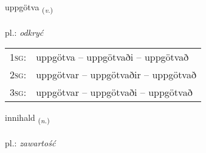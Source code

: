 \documentclass[frontgrid, backgrid]{flacards}\usepackage[]{graphicx}\usepackage[]{xcolor}
\begin{document}
\renewcommand{\flhead}{\vskip5pt \fboxsep=0pt {\small\bfseries\footnotesize Sagnorð | czasownik}}
\renewcommand{\fcfoot}{\vskip5pt \fboxsep=0pt \hspace{2pt}{\small\bfseries\footnotesize 3K}}

\renewcommand{\blhead}{\vskip5pt {\small\bfseries\footnotesize Sagnorð | czasownik }}
\renewcommand{\bcfoot}{\vskip5pt \hspace{2pt}{\small\bfseries\footnotesize 3K}}


{uppgötva \small{\textsubscript{(\textit{v.})}} \\[1ex] %
\textphonetic{[ʏhpkœtva]} \\
pl.: \emph{odkryć} \\  [2ex]
\renewcommand*{\arraystretch}{0.8}
\begin{tabular}{p{1cm}l}
\textsc{1sg}: & uppgötva -- uppgötvaði -- uppgötvað \\ 
\textsc{2sg}: & uppgötvar -- uppgötvaðir -- uppgötvað \\ 
\textsc{3sg}: & uppgötvar -- uppgötvaði -- uppgötvað \\ 
\end{tabular}
}

\renewcommand{\flhead}{\vskip5pt \fboxsep=0pt {\small\bfseries\footnotesize Nafnorð | rzeczownik}}
\renewcommand{\fcfoot}{\vskip5pt \fboxsep=0pt \hspace{2pt}{\small\bfseries\footnotesize 3K}}

\renewcommand{\blhead}{\vskip5pt {\small\bfseries\footnotesize Nafnorð | rzeczownik }}
\renewcommand{\bcfoot}{\vskip5pt \hspace{2pt}{\small\bfseries\footnotesize 3K}}


{innihald \small{\textsubscript{(\textit{n.})}} \\[1ex] %
\textphonetic{[ɪnɪhalt]} \\
pl.: \emph{zawartość} \\  [2ex]
\renewcommand*{\arraystretch}{0.8}
}
\end{document}
